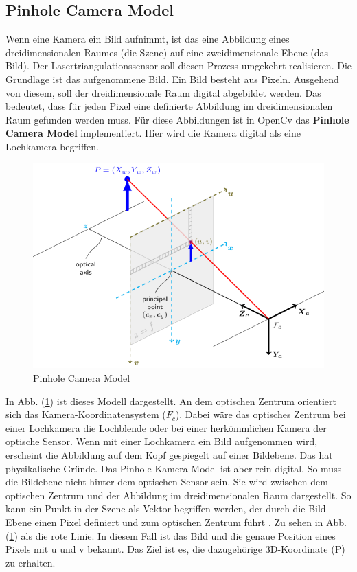 	\subsection{Pinhole Camera Model}
	Wenn eine Kamera ein Bild aufnimmt, ist das eine Abbildung eines dreidimensionalen Raumes (die Szene) auf eine zweidimensionale Ebene (das Bild). Der Lasertriangulationssensor soll diesen Prozess umgekehrt realisieren. Die Grundlage ist das aufgenommene Bild. Ein Bild besteht aus Pixeln. Ausgehend von diesem, soll der dreidimensionale Raum digital abgebildet werden. Das bedeutet, dass für jeden Pixel eine definierte Abbildung im dreidimensionalen Raum gefunden werden muss. Für diese Abbildungen ist in OpenCv das \textbf{Pinhole Camera Model} implementiert. Hier wird die Kamera digital als eine Lochkamera begriffen. \newline
	\begin{figure}[h]
		\centering
		\includegraphics[width=0.7\linewidth]{img/grundlagen/pinhole_camera_model.png}
		\caption{Pinhole Camera Model}
		\label{fig:pinhole-camera-model}
	\end{figure}
	In Abb. (\ref{fig:pinhole-camera-model}) ist dieses Modell dargestellt. An dem optischen Zentrum orientiert sich das Kamera-Koordinatensystem (\( F_c \)). Dabei wäre das optisches Zentrum bei einer Lochkamera die Lochblende oder bei einer herkömmlichen Kamera der optische Sensor. Wenn mit einer Lochkamera ein Bild aufgenommen wird, erscheint die Abbildung auf dem Kopf gespiegelt auf einer Bildebene. Das hat physikalische Gründe. Das Pinhole Kamera Model ist aber rein digital. So muss die Bildebene nicht hinter dem optischen Sensor sein. Sie wird zwischen dem optischen Zentrum und der Abbildung im dreidimensionalen Raum dargestellt. So kann ein Punkt in der Szene als Vektor begriffen werden, der durch die Bild-Ebene einen Pixel definiert und zum optischen Zentrum führt \citep[vgl.][]{dawson-howe_simple_1994}. Zu sehen in Abb. (\ref{fig:pinhole-camera-model}) als die rote Linie. In diesem Fall ist das Bild und die genaue Position eines Pixels mit u und v bekannt. Das Ziel ist es, die dazugehörige 3D-Koordinate (P) zu erhalten.
	\newpage 
	
